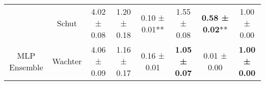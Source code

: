 \begin{table}
{\begin{tabular}[t]{cccccccc}
 & Schut & 4.02 ± 0.08\hphantom{*}\hphantom{*} & 1.20 ± 0.18\hphantom{*}\hphantom{*} & 0.10 ± 0.01** & 1.55 ± 0.08\hphantom{*}\hphantom{*} & \textbf{0.58 ± 0.02}** & 1.00 ± 0.00\hphantom{*}\hphantom{*}\\

\multirow[t]{-7}{*}{\centering\arraybackslash MLP Ensemble} & Wachter & 4.06 ± 0.09\hphantom{*}\hphantom{*} & 1.16 ± 0.17\hphantom{*}\hphantom{*} & 0.16 ± 0.01\hphantom{*}\hphantom{*} & \textbf{1.05 ± 0.07}\hphantom{*}\hphantom{*} & 0.01 ± 0.00\hphantom{*}\hphantom{*} & \textbf{1.00 ± 0.00}\hphantom{*}\hphantom{*}\\
\bottomrule
\end{tabular}}
\end{table}

